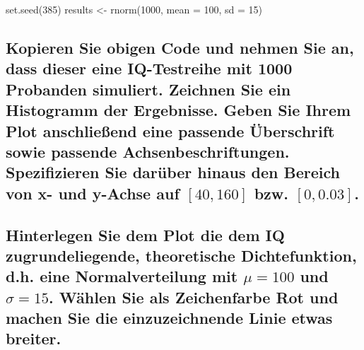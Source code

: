 \documentclass[12pt,a4paper]{article}
\newenvironment{Shaded}{\begin{snugshade}}{\end{snugshade}}
\newcommand{\AttributeTok}[1]{\textcolor[rgb]{0.77,0.63,0.00}{#1}}
\newcommand{\DecValTok}[1]{\textcolor[rgb]{0.00,0.00,0.81}{#1}}
\newcommand{\FunctionTok}[1]{\textcolor[rgb]{0.00,0.00,0.00}{#1}}
\newcommand{\NormalTok}[1]{#1}
\newcommand{\OtherTok}[1]{\textcolor[rgb]{0.56,0.35,0.01}{#1}}
\begin{document}
\begin{Shaded}
\begin{Highlighting}[]
\FunctionTok{set.seed}\NormalTok{(}\DecValTok{385}\NormalTok{)}
\NormalTok{results }\OtherTok{\textless{}{-}} \FunctionTok{rnorm}\NormalTok{(}\DecValTok{1000}\NormalTok{, }\AttributeTok{mean =} \DecValTok{100}\NormalTok{, }\AttributeTok{sd =} \DecValTok{15}\NormalTok{)}
\end{Highlighting}
\end{Shaded}

\hypertarget{kopieren-sie-obigen-code-und-nehmen-sie-an-dass-dieser-eine-iq-testreihe-mit-1000-probanden-simuliert.-zeichnen-sie-ein-histogramm-der-ergebnisse.-geben-sie-ihrem-plot-anschlieuxdfend-eine-passende-uxfcberschrift-sowie-passende-achsenbeschriftungen.-spezifizieren-sie-daruxfcber-hinaus-den-bereich-von-x--und-y-achse-auf-40160-bzw.-00.03.}{%
\subsection{\texorpdfstring{Kopieren Sie obigen Code und nehmen Sie an,
dass dieser eine IQ-Testreihe mit 1000 Probanden simuliert. Zeichnen Sie
ein Histogramm der Ergebnisse. Geben Sie Ihrem Plot anschließend eine
passende Überschrift sowie passende Achsenbeschriftungen. Spezifizieren
Sie darüber hinaus den Bereich von x- und y-Achse auf \([40,160]\) bzw.
\([0,0.03]\).}{Kopieren Sie obigen Code und nehmen Sie an, dass dieser eine IQ-Testreihe mit 1000 Probanden simuliert. Zeichnen Sie ein Histogramm der Ergebnisse. Geben Sie Ihrem Plot anschließend eine passende Überschrift sowie passende Achsenbeschriftungen. Spezifizieren Sie darüber hinaus den Bereich von x- und y-Achse auf {[}40,160{]} bzw. {[}0,0.03{]}.}}\label{kopieren-sie-obigen-code-und-nehmen-sie-an-dass-dieser-eine-iq-testreihe-mit-1000-probanden-simuliert.-zeichnen-sie-ein-histogramm-der-ergebnisse.-geben-sie-ihrem-plot-anschlieuxdfend-eine-passende-uxfcberschrift-sowie-passende-achsenbeschriftungen.-spezifizieren-sie-daruxfcber-hinaus-den-bereich-von-x--und-y-achse-auf-40160-bzw.-00.03.}}

\hypertarget{hinterlegen-sie-dem-plot-die-dem-iq-zugrundeliegende-theoretische-dichtefunktion-d.h.-eine-normalverteilung-mit-mu100-und-sigma15.-wuxe4hlen-sie-als-zeichenfarbe-rot-und-machen-sie-die-einzuzeichnende-linie-etwas-breiter.}{%
\subsection{\texorpdfstring{Hinterlegen Sie dem Plot die dem IQ
zugrundeliegende, theoretische Dichtefunktion, d.h. eine
Normalverteilung mit \(\mu=100\) und \(\sigma=15\). Wählen Sie als
Zeichenfarbe Rot und machen Sie die einzuzeichnende Linie etwas
breiter.}{Hinterlegen Sie dem Plot die dem IQ zugrundeliegende, theoretische Dichtefunktion, d.h. eine Normalverteilung mit \textbackslash mu=100 und \textbackslash sigma=15. Wählen Sie als Zeichenfarbe Rot und machen Sie die einzuzeichnende Linie etwas breiter.}}\label{hinterlegen-sie-dem-plot-die-dem-iq-zugrundeliegende-theoretische-dichtefunktion-d.h.-eine-normalverteilung-mit-mu100-und-sigma15.-wuxe4hlen-sie-als-zeichenfarbe-rot-und-machen-sie-die-einzuzeichnende-linie-etwas-breiter.}}
\end{document}
